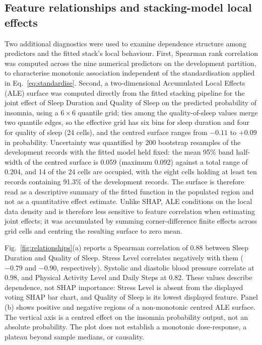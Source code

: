 \documentclass[a4paper,fleqn]{cas-dc}
\begin{document}
\subsection{Feature relationships and stacking-model local effects}
\label{sec:ale}
Two additional diagnostics were used to examine dependence structure among predictors and the fitted stack's local behaviour. First, Spearman rank correlation was computed across the nine numerical predictors on the development partition, to characterise monotonic association independent of the standardisation applied in Eq.~\eqref{eq:standardise}. Second, a two-dimensional Accumulated Local Effects (ALE) surface \cite{apley2020} was computed directly from the fitted stacking pipeline for the joint effect of Sleep Duration and Quality of Sleep on the predicted probability of insomnia, using a $6\times6$ quantile grid; ties among the quality-of-sleep values merge two quantile edges, so the effective grid has six bins for sleep duration and four for quality of sleep (24 cells), and the centred surface ranges from $-0.11$ to $+0.09$ in probability. Uncertainty was quantified by 200 bootstrap resamples of the development records with the fitted model held fixed: the mean 95\% band half-width of the centred surface is 0.059 (maximum 0.092) against a total range of 0.204, and 14 of the 24 cells are occupied, with the eight cells holding at least ten records containing 91.3\% of the development records. The surface is therefore read as a descriptive summary of the fitted function in the populated region and not as a quantitative effect estimate. Unlike SHAP, ALE conditions on the local data density and is therefore less sensitive to feature correlation when estimating joint effects; it was accumulated by summing corner-difference finite effects across grid cells and centring the resulting surface to zero mean.

Fig.~\ref{fig:relationships}(a) reports a Spearman correlation of 0.88 between Sleep Duration and Quality of Sleep. Stress Level correlates negatively with them ($-0.79$ and $-0.90$, respectively). Systolic and diastolic blood pressure correlate at 0.98, and Physical Activity Level and Daily Steps at 0.82. These values describe dependence, not SHAP importance: Stress Level is absent from the displayed voting SHAP bar chart, and Quality of Sleep is its lowest displayed feature. Panel (b) shows positive and negative regions of a non-monotonic centred ALE surface. The vertical axis is a centred effect on the insomnia probability output, not an absolute probability. The plot does not establish a monotonic dose-response, a plateau beyond sample medians, or causality.
\end{document}
